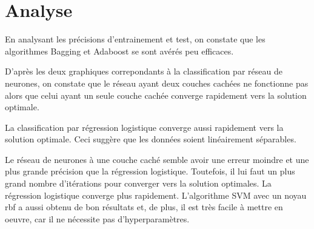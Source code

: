 \section{Analyse}
\par En analysant les précisions d'entrainement et test, on constate que les algorithmes Bagging et Adaboost se sont avérés peu efficaces.
\par D'après les deux graphiques correpondants à la classification par réseau de neurones, on constate que le réseau ayant deux couches cachées ne fonctionne pas alors que  celui ayant un seule couche cachée converge rapidement vers la solution optimale.
\par La classification par régression logistique converge aussi rapidement vers la solution optimale. Ceci suggère que les données soient linéairement séparables.
\par Le réseau de neurones à une couche caché semble avoir une erreur moindre et une plus grande précision que la régression logistique. Toutefois, il lui faut un plus
grand nombre d'itérations pour
converger vers la solution optimales. La régression logistique converge plus rapidement. L'algorithme SVM avec un noyau rbf a aussi obtenu de bon résultats et, de plus, 
il est très facile à mettre en oeuvre, car il ne nécessite pas d'hyperparamètres.


